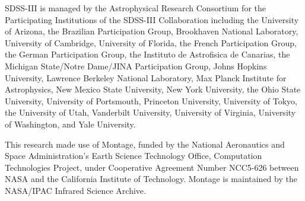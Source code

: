 \documentclass[10pt,preprint]{aastex}
\begin{document}
SDSS-III is managed by the Astrophysical Research Consortium for the
Participating Institutions of the SDSS-III Collaboration including the
University of Arizona, the Brazilian Participation Group, Brookhaven
National Laboratory, University of Cambridge, University of Florida,
the French Participation Group, the German Participation Group, the
Instituto de Astrofisica de Canarias, the Michigan State/Notre
Dame/JINA Participation Group, Johns Hopkins University, Lawrence
Berkeley National Laboratory, Max Planck Institute for Astrophysics,
New Mexico State University, New York University, the Ohio State
University, University of Portsmouth, Princeton University, University
of Tokyo, the University of Utah, Vanderbilt University, University of
Virginia, University of Washington, and Yale University.

This research made use of Montage, funded by the National Aeronautics and
Space Administration's Earth Science Technology Office, Computation
Technologies Project, under Cooperative Agreement Number NCC5-626 between
NASA and the California Institute of Technology. Montage is maintained by
the NASA/IPAC Infrared Science Archive.
\end{document}
